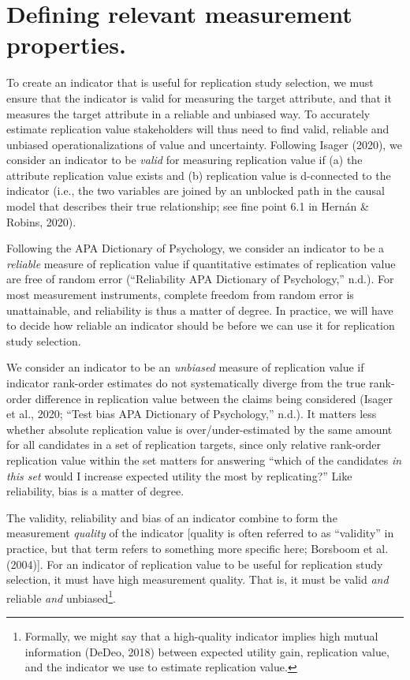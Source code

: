 \documentclass[
  english,
  jou,floatsintext]{apa6}
\begin{document}
\hypertarget{defining-relevant-measurement-properties.}{%
\section{Defining relevant measurement properties.}\label{defining-relevant-measurement-properties.}}

To create an indicator that is useful for replication study selection, we must ensure that the indicator is valid for measuring the target attribute, and that it measures the target attribute in a reliable and unbiased way. To accurately estimate replication value stakeholders will thus need to find valid, reliable and unbiased operationalizations of value and uncertainty. Following Isager (2020), we consider an indicator to be \emph{valid} for measuring replication value if (a) the attribute replication value exists and (b) replication value is d-connected to the indicator (i.e., the two variables are joined by an unblocked path in the causal model that describes their true relationship; see fine point 6.1 in Hernán \& Robins, 2020).

Following the APA Dictionary of Psychology, we consider an indicator to be a \emph{reliable} measure of replication value if quantitative estimates of replication value are free of random error ({``Reliability \textendash{} {APA Dictionary} of {Psychology},''} n.d.). For most measurement instruments, complete freedom from random error is unattainable, and reliability is thus a matter of degree. In practice, we will have to decide how reliable an indicator should be before we can use it for replication study selection.

We consider an indicator to be an \emph{unbiased} measure of replication value if indicator rank-order estimates do not systematically diverge from the true rank-order difference in replication value between the claims being considered (Isager et al., 2020; {``Test bias \textendash{} {APA Dictionary} of {Psychology},''} n.d.). It matters less whether absolute replication value is over/under-estimated by the same amount for all candidates in a set of replication targets, since only relative rank-order replication value within the set matters for answering ``which of the candidates \emph{in this set} would I increase expected utility the most by replicating?'' Like reliability, bias is a matter of degree.

The validity, reliability and bias of an indicator combine to form the measurement \emph{quality} of the indicator {[}quality is often referred to as ``validity'' in practice, but that term refers to something more specific here; Borsboom et al. (2004){]}. For an indicator of replication value to be useful for replication study selection, it must have high measurement quality. That is, it must be valid \emph{and} reliable \emph{and} unbiased\footnote{Formally, we might say that a high-quality indicator implies high mutual information (DeDeo, 2018) between expected utility gain, replication value, and the indicator we use to estimate replication value.}.
\end{document}
